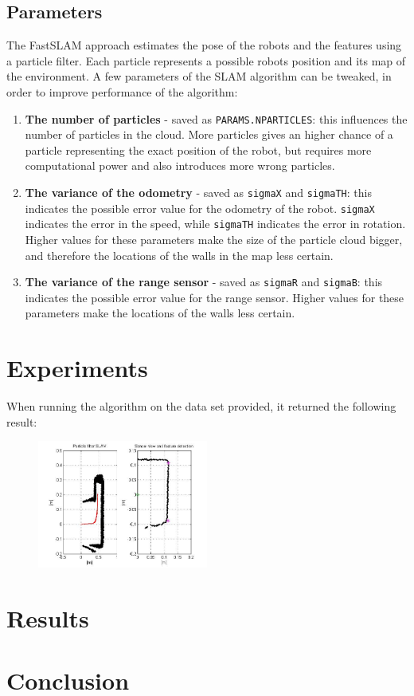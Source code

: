 \documentclass[12pt]{article}
\begin{document}
\subsection{Parameters}
The FastSLAM approach estimates the pose of the robots and the features using a particle filter. Each particle represents a possible robots position and its map of the environment. A few parameters of the SLAM algorithm can be tweaked, in order to improve performance of the algorithm:
\begin{enumerate}
\item \textbf{The number of particles} - saved as \verb|PARAMS.NPARTICLES|: this influences the number of particles in the cloud. More particles gives an higher chance of a particle representing the exact position of the robot, but requires more computational power and also introduces more wrong particles.
\item \textbf{The variance of the odometry} - saved as \verb|sigmaX| and \verb|sigmaTH|: this indicates the possible error value for the odometry of the robot. \verb|sigmaX| indicates the error in the speed, while \verb|sigmaTH| indicates the error in rotation. Higher values for these parameters make the size of the particle cloud bigger, and therefore the locations of the walls in the map less certain.
\item \textbf{The variance of the range sensor} - saved as \verb|sigmaR| and \verb|sigmaB|: this indicates the possible error value for the range sensor. Higher values for these parameters make the locations of the walls less certain.
\end{enumerate}
\section{Experiments}
When running the algorithm on the data set provided, it returned the following result:
\begin{figure}[h!]
	\centering
	\includegraphics[width=0.5\textwidth]{normal.jpg}
\end{figure}
\section{Results}

\section{Conclusion}
\end{document}
